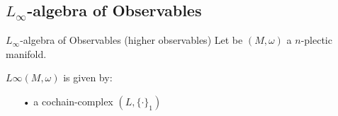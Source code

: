 \documentclass[handout,10pt]{beamer}
\begin{document}
    \subsection{$L_\infty$-algebra of Observables}
      \begin{frame}[fragile,t]{$L_\infty$-algebra of Observables (higher observables) }
        Let be $(M,\omega)$ a $n$-plectic manifold.
        \begin{defblock}
    
          \hspace{.25em} $L\infty(M,\omega)$ is given by:
    
          \begin{itemize}
            \item[•] a cochain-complex $(L,\{\cdot\}_1)$
          \end{itemize}
          \begin{center}
            \ifHandout
            
            \else
            
            \fi
          \end{center}
        \end{defblock}
      \end{frame}
\end{document}

